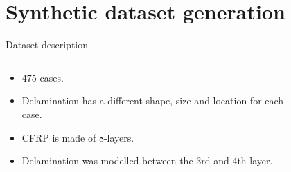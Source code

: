 \documentclass[10pt,aspectratio=169,dvipsnames]{beamer} %
\begin{document}
%	
\setcounter{subfigure}{0}
\section{Synthetic dataset generation}
\begin{frame}{Dataset description}
	\begin{columns}[T]
		\begin{column}[c]{0.35\textwidth}
			\begin{itemize}				
				\item 475 cases.
				\item Delamination has a different shape, size and location for each case.
				\item CFRP is made of 8-layers.
				\item Delamination was modelled between the 3rd and 4th layer.
			\end{itemize}
		\end{column}
		\begin{column}[c]{0.6\textwidth}
			\begin{figure}
				\centering
				\qquad
			\end{figure}
		\end{column}
	\end{columns}
\end{frame}
\end{document}

